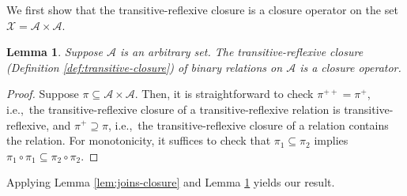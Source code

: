 \documentclass[conference]{ieeeconf}
\newcommand{\A}{\mathcal{A}}
\newcommand{\X}{\mathcal{X}}
\newtheorem{lemma}{Lemma}
\begin{document}
We first show that the transitive-reflexive closure is a closure operator on the set $\X = \A \times \A$.

\begin{lemma} \label{lem:transitive-closure}
    Suppose $\A$ is an arbitrary set. The transitive-reflexive closure (Definition \ref{def:transitive-closure}) of binary relations on $\A$ is a closure operator.
\end{lemma}
\begin{proof}
Suppose $\pi \subseteq \A \times \A$. Then, it is straightforward to check $\pi^{++} = \pi^{+}$, i.e.,~the transitive-reflexive closure of a transitive-reflexive relation is transitive-reflexive, and $\pi^{+} \supseteq \pi$, i.e.,~the transitive-reflexive closure of a relation contains the relation. For monotonicity, it suffices to check that $\pi_1 \subseteq \pi_2$ implies $\pi_1 \circ \pi_1 \subseteq \pi_2 \circ \pi_2$.
\end{proof}

Applying Lemma \ref{lem:joins-closure} and Lemma \ref{lem:transitive-closure} yields our result.
\end{document}
